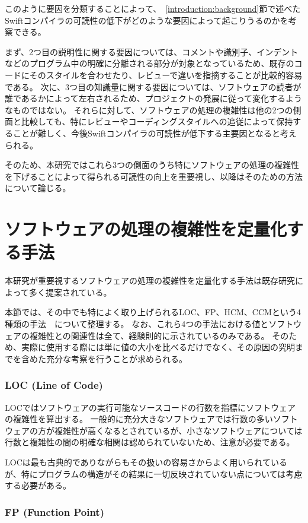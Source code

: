このように要因を分類することによって、~\ref{introduction:background}節で述べたSwiftコンパイラの可読性の低下がどのような要因によって起こりうるのかを考察できる。

まず、2つ目の説明性に関する要因については、コメントや識別子、インデントなどのプログラム中の明確に分離される部分が対象となっているため、既存のコードにそのスタイルを合わせたり、レビューで違いを指摘することが比較的容易である。
次に、3つ目の知識量に関する要因については、ソフトウェアの読者が誰であるかによって左右されるため、プロジェクトの発展に従って変化するようなものではない。
それらに対して、ソフトウェアの処理の複雑性は他の2つの側面と比較しても、特にレビューやコーディングスタイルへの追従によって保持することが難しく、今後Swiftコンパイラの可読性が低下する主要因となると考えられる。

そのため、本研究ではこれら3つの側面のうち特にソフトウェアの処理の複雑性を下げることによって得られる可読性の向上を重要視し、以降はそのための方法について論じる。


\section{ソフトウェアの処理の複雑性を定量化する手法}
\label{issue:method}

本研究が重要視するソフトウェアの処理の複雑性を定量化する手法は既存研究によって多く提案されている。

本節では、その中でも特によく取り上げられるLOC、FP、HCM、CCMという4種類の手法~\cite{yu}~\cite{symons}について整理する。
なお、これら4つの手法における値とソフトウェアの複雑性との関連性は全て、経験則的に示されているのみである。
そのため、実際に使用する際には単に値の大小を比べるだけでなく、その原因の究明までを含めた充分な考察を行うことが求められる。

\subsubsection{LOC (Line of Code)}

LOCではソフトウェアの実行可能なソースコードの行数を指標にソフトウェアの複雑性を算出する。
一般的に充分大きなソフトウェアでは行数の多いソフトウェアの方が複雑性が高くなるとされているが、小さなソフトウェアについては行数と複雑性の間の明確な相関は認められていないため、注意が必要である。

LOCは最も古典的でありながらもその扱いの容易さからよく用いられているが、特にプログラムの構造がその結果に一切反映されていない点については考慮する必要がある。

\subsubsection{FP (Function Point)}

